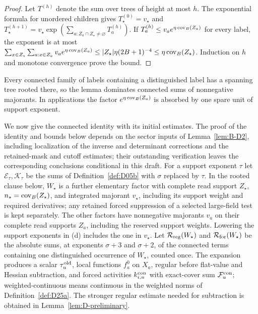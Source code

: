 \begin{proof}
Let $T^{(h)}$ denote the sum over trees of height at most $h$. The exponential formula for unordered children gives $T_\star^{(0)}=v_\star$ and $T_\star^{(h+1)}=v_\star\exp(\sum_{a:Z_a\cap Z_\star\ne\varnothing}T_a^{(h)})$. If $T_a^{(h)}\le v_ae^{\eta\operatorname{cov}_B(Z_a)}$ for every label, the exponent is at most $\sum_{x\in Z_\star}\sum_{a:x\in Z_a}v_ae^{\eta\operatorname{cov}_B(Z_a)}\le|Z_\star|\eta(2B+1)^{-4}\le\eta\operatorname{cov}_B(Z_\star)$. Induction on $h$ and monotone convergence prove the bound.
\end{proof}

Every connected family of labels containing a distinguished label has a spanning tree rooted there, so the lemma dominates connected sums of nonnegative majorants. In applications the factor $e^{\eta\operatorname{cov}_B(Z_a)}$ is absorbed by one spare unit of support exponent.

We now give the connected identity with its initial estimates. The proof of the identity and bounds below depends on the sector inputs of Lemma~\ref{lem:B-D2}, including localization of the inverse and determinant corrections and the retained-mask and cutoff estimates; their outstanding verification leaves the corresponding conclusions conditional in this draft. For a support exponent $\tau$ let $\mathcal E_\tau,\mathcal K_\tau$ be the sums of Definition~\ref{def:D05b} with $\sigma$ replaced by $\tau$. In the rooted clause below, $W_\star$ is a further elementary factor with complete read support $Z_\star$, $n_\star=\operatorname{cov}_B(Z_\star)$, and integrated majorant $v_\star$, including its support weight and required derivatives; any retained forced suppression of a selected large-field test is kept separately. The other factors have nonnegative majorants $v_a$ on their complete read supports $Z_a$, including the reserved support weights. Lowering the support exponents in (d) includes the one in $v_\star$. Let $\mathcal R_{\rm reg}(W_\star)$ and $\mathcal R_{\rm for}(W_\star)$ be the absolute sums, at exponents $\sigma+3$ and $\sigma+2$, of the connected terms containing one distinguished occurrence of $W_\star$, counted once. The expansion produces a scalar $\tau_u^{\rm old}$, local functions $f_a^0$ on $X_a$, regular before flat-value and Hessian subtraction, and forced activities $k_{i,u}^{\rm con}$ with exact-cover sum $\mathcal F_u^{\rm con}$; weighted-continuous means continuous in the weighted norms of Definition~\ref{def:D25a}. The stronger regular estimate needed for subtraction is obtained in Lemma~\ref{lem:D-preliminary}.

